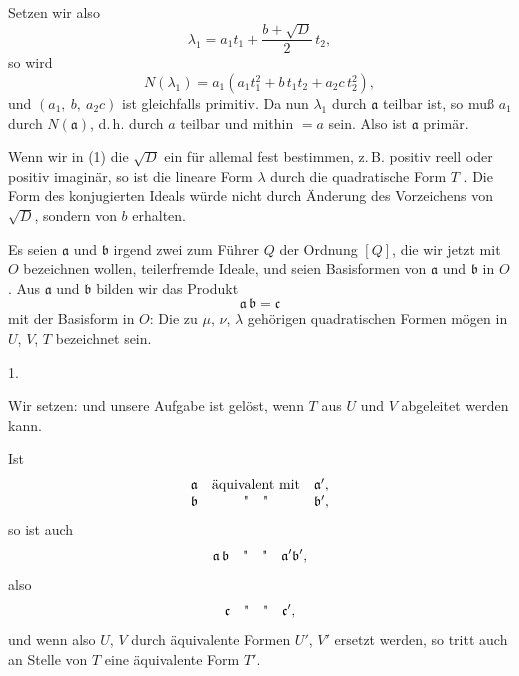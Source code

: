 Setzen wir also
\[
\lambda_1 = a_1 t_1 + \frac{b+\sqrt D}{2}\,t_2,
\]
so wird
\[
N(\lambda_1) = a_1 (a_1 t_1^2 + b\,t_1 t_2 + a_2 c\,t_2^2),
\]
und $(a_1,\ b,\ a_2 c)$ ist gleichfalls primitiv. Da nun $\lambda_1$ durch $\mathfrak{a}$ teilbar ist, so muß $a_1$ durch $N(\mathfrak{a})$, d.\,h. durch $a$ teilbar und mithin $=a$ sein. Also ist $\mathfrak{a}$ primär.

Wenn wir in (1) die $\sqrt D$ ein für allemal fest bestimmen, z.\,B. positiv reell oder positiv imaginär, so ist die lineare Form $\lambda$ durch die quadratische Form $T$ . Die Form des konjugierten Ideals würde nicht durch Änderung des Vorzeichens von $\sqrt D$, sondern von $b$ erhalten.

Es seien $\mathfrak{a}$ und $\mathfrak{b}$ irgend zwei zum Führer $Q$ der Ordnung $[Q]$, die wir jetzt mit $O$ bezeichnen wollen, teilerfremde Ideale, und
seien Basisformen von $\mathfrak{a}$ und $\mathfrak{b}$ in $O$. Aus $\mathfrak{a}$ und $\mathfrak{b}$ bilden wir das Produkt
\[
\mathfrak{a}\,\mathfrak{b} = \mathfrak{c}
\]
mit der Basisform in $O$:
Die zu $\mu$, $\nu$, $\lambda$ gehörigen quadratischen Formen mögen in $U$, $V$, $T$ bezeichnet sein.

1. 

Wir setzen:
und unsere Aufgabe ist gelöst, wenn $T$ aus $U$ und $V$ abgeleitet werden kann.

Ist
\[
\begin{array}{lcl}
\mathfrak{a} & \text{äquivalent mit} & \mathfrak{a}', \\
\mathfrak{b} & \text{\textquotedbl}\quad\text{\textquotedbl} & \mathfrak{b}',
\end{array}
\]
so ist auch
\[
\mathfrak{a}\,\mathfrak{b} \quad \text{\textquotedbl}\quad\text{\textquotedbl} \quad \mathfrak{a}'\mathfrak{b}',
\]
also
\[
\mathfrak{c} \quad \text{\textquotedbl}\quad\text{\textquotedbl} \quad \mathfrak{c}',
\]
und wenn also $U$, $V$ durch äquivalente Formen $U'$, $V'$ ersetzt werden, so tritt auch an Stelle von $T$ eine äquivalente Form $T'$.
